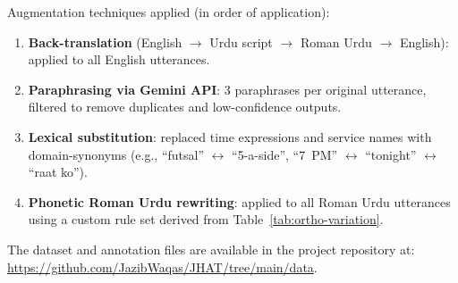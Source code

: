 \noindent Augmentation techniques applied (in order of application):
\begin{enumerate}
  \item \textbf{Back-translation} (English $\to$ Urdu script $\to$ Roman Urdu $\to$
        English): applied to all English utterances.
  \item \textbf{Paraphrasing via Gemini API}: 3 paraphrases per original utterance,
        filtered to remove duplicates and low-confidence outputs.
  \item \textbf{Lexical substitution}: replaced time expressions and service names
        with domain-synonyms (e.g., ``futsal'' $\leftrightarrow$ ``5-a-side'',
        ``7~PM'' $\leftrightarrow$ ``tonight'' $\leftrightarrow$ ``raat ko'').
  \item \textbf{Phonetic Roman Urdu rewriting}: applied to all Roman Urdu utterances
        using a custom rule set derived from Table~\ref{tab:ortho-variation}.
\end{enumerate}

The dataset and annotation files are available in the project repository at:\\
\url{https://github.com/JazibWaqas/JHAT/tree/main/data}.

